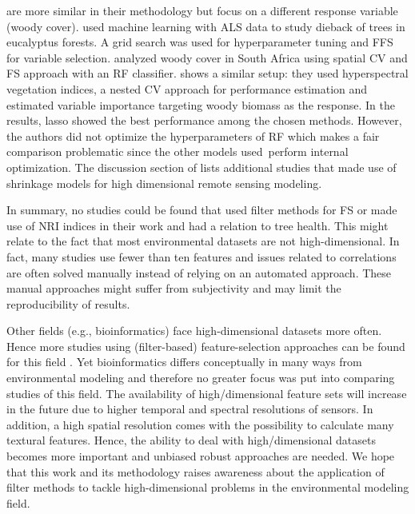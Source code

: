 \documentclass[remotesensing,article,submit,moreauthors,pdftex]{Definitions/mdpi}
\begin{document}
\cite{shendryk2016, ludwig2019} are more similar in their methodology but focus on a different response variable (woody cover).
\cite{shendryk2016} used machine learning with \ac{ALS} data to study dieback of trees in eucalyptus forests.
A grid search was used for hyperparameter tuning and \ac{FFS} for variable selection.
\cite{ludwig2019} analyzed woody cover in South Africa using spatial \ac{CV} and \ac{FS} approach \cite{meyer2018} with an RF classifier.
\cite{zandler2015} shows a similar setup: they used hyperspectral vegetation indices, a nested CV approach for performance estimation and estimated variable importance targeting woody biomass as the response.
In the results, lasso showed the best performance among the chosen methods.
However, the authors did not optimize the hyperparameters of RF which makes a fair comparison problematic since the other models used\ perform internal optimization.
The discussion section of \cite{zandler2015} lists additional studies that made use of shrinkage models for high dimensional remote sensing modeling.

In summary, no studies could be found that used filter methods for \ac{FS} or made use of \ac{NRI} indices in their work and had a relation to tree health.
This might relate to the fact that most environmental datasets are not high-dimensional.
In fact, many studies use fewer than ten features and issues related to correlations are often solved manually instead of relying on an automated approach.
These manual approaches might suffer from subjectivity and may limit the reproducibility of results.

Other fields (e.g., bioinformatics) face high-dimensional datasets more often.
Hence more studies using (filter-based) feature-selection approaches can be found for this field \cite{guo2019, radovic2017}.
Yet bioinformatics differs conceptually in many ways from environmental modeling and therefore no greater focus was put into comparing studies of this field.
The availability of high\-/dimensional feature sets will increase in the future due to higher temporal and spectral resolutions of sensors.
In addition, a high spatial resolution comes with the possibility to calculate many textural features.
Hence, the ability to deal with high\-/dimensional datasets becomes more important and unbiased robust approaches are needed.
We hope that this work and its methodology raises awareness about the application of filter methods to tackle high-dimensional problems in the environmental modeling field.

\end{document}
